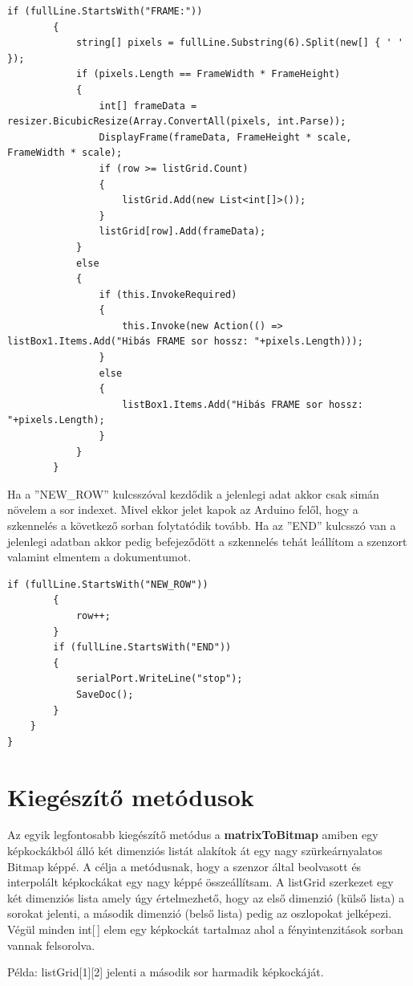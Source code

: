 \documentclass[]{thesis-ekf}
\theoremstyle{definition}
\theoremstyle{remark}
\begin{document}
\begin{lstlisting}[language=CSharp]
		if (fullLine.StartsWith("FRAME:"))
		{
			string[] pixels = fullLine.Substring(6).Split(new[] { ' ' });
			if (pixels.Length == FrameWidth * FrameHeight)
			{
				int[] frameData = resizer.BicubicResize(Array.ConvertAll(pixels, int.Parse));
				DisplayFrame(frameData, FrameHeight * scale, FrameWidth * scale);
				if (row >= listGrid.Count)
				{
					listGrid.Add(new List<int[]>());
				}
				listGrid[row].Add(frameData);
			}
			else
			{
				if (this.InvokeRequired)
				{
					this.Invoke(new Action(() => listBox1.Items.Add("Hibás FRAME sor hossz: "+pixels.Length)));
				}
				else
				{
					listBox1.Items.Add("Hibás FRAME sor hossz: "+pixels.Length);
				}
			}
		}
\end{lstlisting}
Ha a ''NEW\_ROW'' kulcsszóval kezdődik a jelenlegi adat akkor csak simán növelem a sor indexet. Mivel ekkor jelet kapok az Arduino felől, hogy a szkennelés a következő sorban folytatódik tovább. Ha az ''END'' kulcsszó van a jelenlegi adatban akkor pedig befejeződött a szkennelés tehát leállítom a szenzort valamint elmentem a dokumentumot.
\begin{lstlisting}[language=CSharp]
		if (fullLine.StartsWith("NEW_ROW"))
		{
			row++;	
		}
		if (fullLine.StartsWith("END"))
		{
			serialPort.WriteLine("stop");
			SaveDoc();
		}
	}
}
\end{lstlisting}
\section{Kiegészítő metódusok}
Az egyik legfontosabb kiegészítő metódus a \textbf{matrixToBitmap}\cite{matrixToBitmap} amiben egy képkockákból álló két dimenziós listát alakítok át egy nagy szürkeárnyalatos Bitmap\cite{bitmap.class} képpé. A célja a metódusnak, hogy a szenzor által beolvasott és interpolált képkockákat egy nagy képpé összeállítsam. A listGrid szerkezet egy két dimenziós lista amely úgy értelmezhető, hogy az első dimenzió (külső lista) a sorokat jelenti, a második dimenzió (belső lista) pedig az oszlopokat jelképezi. Végül minden int[\,] elem egy képkockát tartalmaz ahol a fényintenzitások sorban vannak felsorolva. 

Példa: listGrid[1][2] jelenti a második sor harmadik képkockáját.
\end{document}
